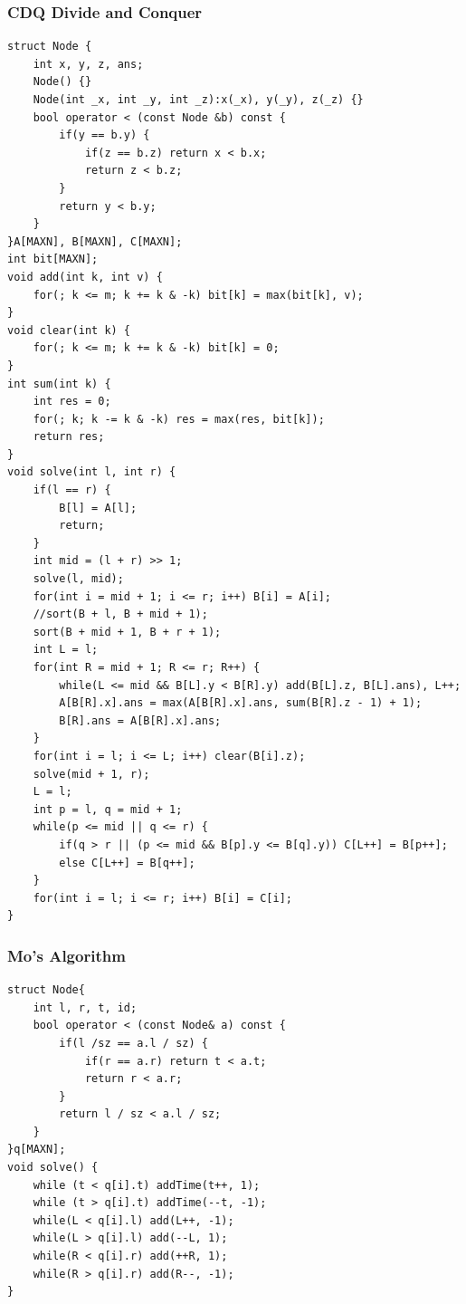 \documentclass[10pt]{ctexart}
\begin{document}
{\subsubsection{CDQ Divide and Conquer}
\begin{lstlisting}
struct Node {
    int x, y, z, ans;
    Node() {}
    Node(int _x, int _y, int _z):x(_x), y(_y), z(_z) {}
    bool operator < (const Node &b) const {
        if(y == b.y) {
            if(z == b.z) return x < b.x;
            return z < b.z;
        }
        return y < b.y;
    }
}A[MAXN], B[MAXN], C[MAXN];
int bit[MAXN];
void add(int k, int v) {
    for(; k <= m; k += k & -k) bit[k] = max(bit[k], v);
}
void clear(int k) {
    for(; k <= m; k += k & -k) bit[k] = 0;
}
int sum(int k) {
    int res = 0;
    for(; k; k -= k & -k) res = max(res, bit[k]);
    return res;
}
void solve(int l, int r) {
    if(l == r) {
        B[l] = A[l];
        return;
    }
    int mid = (l + r) >> 1;
    solve(l, mid);
    for(int i = mid + 1; i <= r; i++) B[i] = A[i];
    //sort(B + l, B + mid + 1);
    sort(B + mid + 1, B + r + 1);
    int L = l;
    for(int R = mid + 1; R <= r; R++) {
        while(L <= mid && B[L].y < B[R].y) add(B[L].z, B[L].ans), L++;
        A[B[R].x].ans = max(A[B[R].x].ans, sum(B[R].z - 1) + 1);
        B[R].ans = A[B[R].x].ans;
    }
    for(int i = l; i <= L; i++) clear(B[i].z);
    solve(mid + 1, r);
    L = l;
    int p = l, q = mid + 1;
    while(p <= mid || q <= r) {
        if(q > r || (p <= mid && B[p].y <= B[q].y)) C[L++] = B[p++];
        else C[L++] = B[q++];
    }
    for(int i = l; i <= r; i++) B[i] = C[i];
}
\end{lstlisting}
\subsubsection{Mo’s Algorithm}
\begin{lstlisting}
struct Node{
    int l, r, t, id;
    bool operator < (const Node& a) const {
        if(l /sz == a.l / sz) {
            if(r == a.r) return t < a.t;
            return r < a.r;
        }
        return l / sz < a.l / sz;
    }
}q[MAXN];
void solve() {
    while (t < q[i].t) addTime(t++, 1);
    while (t > q[i].t) addTime(--t, -1);
    while(L < q[i].l) add(L++, -1);
    while(L > q[i].l) add(--L, 1);
    while(R < q[i].r) add(++R, 1);
    while(R > q[i].r) add(R--, -1);
}
\end{lstlisting}
}
\end{document}
